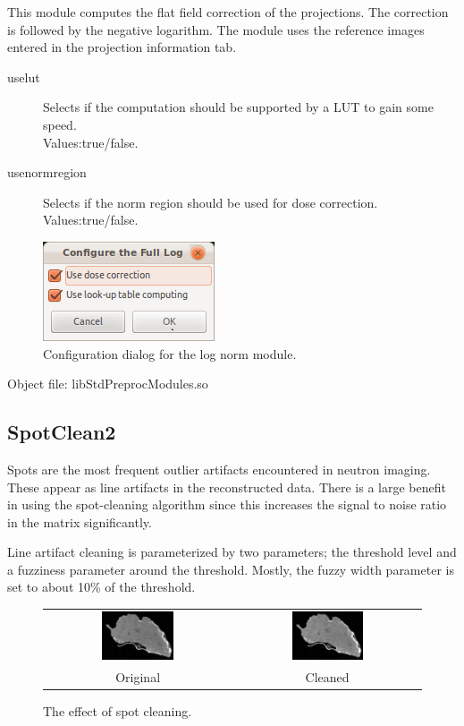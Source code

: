\documentclass[a4paper]{scrreprt}
\begin{document}
This module computes the flat field correction of the projections. The
correction is followed by the negative logarithm. The module uses the reference
images entered in the projection information tab.
\begin{description}
 \item[uselut] Selects if the computation should be
supported by a LUT to gain some speed. \\Values:true/false.
\item[usenormregion] Selects if the norm region should be used for dose
correction. \\Values:true/false.
\end{description}
\begin{figure}[ht!]
\centering
\includegraphics[scale=0.5]{figures/ConfigLogNorm.png}
\caption{Configuration dialog for the log norm module.}
\end{figure}
Object file: libStdPreprocModules.so

\subsection{SpotClean2}
Spots are the most frequent outlier artifacts encountered in neutron imaging.
These appear as line artifacts in the reconstructed data. There is a large
benefit in using the spot-cleaning algorithm since this increases the signal to
noise ratio in the matrix significantly.

Line artifact cleaning is parameterized by two parameters; the threshold level
and a fuzziness parameter around the threshold. Mostly, the fuzzy width
parameter is set to about 10\% of the threshold.
\begin{figure}[ht!]
\centering
\begin{tabular}{cc}
\includegraphics[width=0.4\textwidth]{figures/lineartifact_raw.png}&
\includegraphics[width=0.4\textwidth]{figures/lineartifact_clean.png}\\
Original & Cleaned
\end{tabular}
\caption{The effect of spot cleaning.}\label{fig_spotcleaning}
\end{figure}
\end{document}
